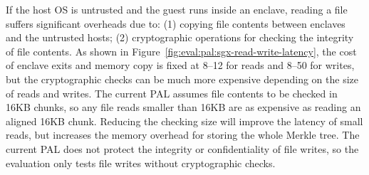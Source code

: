 
If the host OS is untrusted and the guest runs inside an enclave,
reading a file suffers
significant overheads
due to:
(1) copying file contents between enclaves and the untrusted hosts; (2) cryptographic operations for checking the integrity of file contents.  
As shown in Figure~\ref{fig:eval:pal:sgx-read-write-latency},
the cost of enclave exits
and memory copy is fixed at
8--12 \usec{} for reads and 8--50 \usec{} for writes,
but the cryptographic checks
can be much more expensive depending on the size of reads and writes.
The current \sgx{} PAL
assumes file contents to be checked in 16KB chunks,
so any file reads smaller than 16KB are as expensive as reading an aligned 16KB chunk. 
Reducing the checking size
will improve
the latency of small reads,
but increases the memory overhead for storing the whole Merkle tree.
The current \sgx{} PAL does not protect the integrity or confidentiality of file writes,
so the evaluation only tests file writes
without cryptographic checks.








